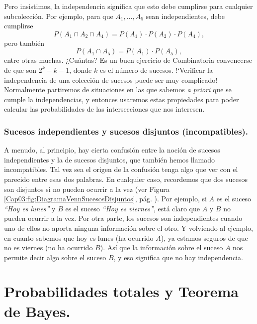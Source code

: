 Pero insistimos, la independencia significa que esto debe cumplirse para cualquier subcolección. Por ejemplo,  para que $A_1,\ldots,A_5$ sean independientes, debe cumplirse
\[P(A_1\cap A_2\cap A_4)=P(A_1)\cdot P(A_2)\cdot P(A_4),\]
pero también
\[P(A_1\cap A_5)=P(A_1)\cdot P(A_5),\]
entre otras muchas. ¿Cuántas? Es un buen ejercicio de Combinatoria convencerse de que son $2^k - k -1$, donde $k$ es el número de sucesos. {!`}Verificar la independencia de una colección de sucesos puede ser muy complicado! Normalmente partiremos de situaciones en las que sabemos {\em a priori} que se cumple la independencias, y entonces usaremos estas propiedades para poder calcular las probabilidades de las intersecciones que nos interesen.

\subsubsection{Sucesos independientes y sucesos disjuntos (incompatibles).}

A menudo, al principio, hay cierta confusión entre la noción de sucesos independientes y la de sucesos disjuntos, que también hemos llamado incompatibles. Tal vez sea el origen de la confusión tenga algo que ver con el parecido entre esas dos palabras.  En cualquier caso, recordemos que dos sucesos son disjuntos si no pueden ocurrir a la vez (ver Figura \ref{Cap03:fig:DiagramaVennSucesosDisjuntos}, pág. \pageref{Cap03:fig:DiagramaVennSucesosDisjuntos}). Por ejemplo, si $A$ es el suceso {\em ``Hoy es lunes''} y $B$ es el suceso {\em ``Hoy es viernes''}, está
claro que $A$ y $B$ no pueden ocurrir a la vez. Por otra parte, los sucesos son independientes cuando uno de ellos no aporta ninguna información sobre
el otro. Y volviendo al ejemplo, en cuanto sabemos que hoy es lunes (ha ocurrido $A$), ya estamos seguros de que no es viernes (no ha ocurrido $B$).
Así que la información sobre el suceso $A$ nos permite decir algo sobre el suceso $B$, y eso significa que no hay independencia.
        \begin{center}
        \end{center}

\section{Probabilidades totales y Teorema de Bayes.}
\label{cap03:sec:ProbabilidadesTotalesReglaBayes}


